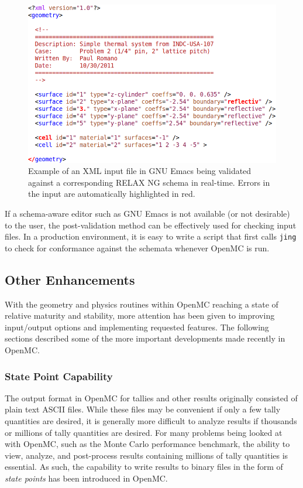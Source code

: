 \documentclass{ansconf}
\begin{document}
\begin{figure}[!htb]
  \centering
  \includegraphics[width=5.0in]{relaxng.png}
  \caption{Example of an XML input file in GNU Emacs being validated against a
    corresponding RELAX NG schema in real-time. Errors in the input are
    automatically highlighted in red.}
  \label{fig:relaxng}
\end{figure}

If a schema-aware editor such as GNU Emacs is not available (or not desirable)
to the user, the post-validation method can be effectively used for checking
input files. In a production environment, it is easy to write a script that
first calls \texttt{jing} to check for conformance against the schemata whenever
OpenMC is run.

\subsection{Other Enhancements}

With the geometry and physics routines within OpenMC reaching a state of
relative maturity and stability, more attention has been given to improving
input/output options and implementing requested features. The following sections
described some of the more important developments made recently in OpenMC.

\subsubsection{State Point Capability}

The output format in OpenMC for tallies and other results originally consisted
of plain text ASCII files. While these files may be convenient if only a few
tally quantities are desired, it is generally more difficult to analyze results
if thousands or millions of tally quantities are desired. For many problems
being looked at with OpenMC, such as the Monte Carlo performance benchmark, the
ability to view, analyze, and post-process results containing millions of tally
quantities is essential. As such, the capability to write results to binary
files in the form of \emph{state points} has been introduced in OpenMC.
\end{document}
